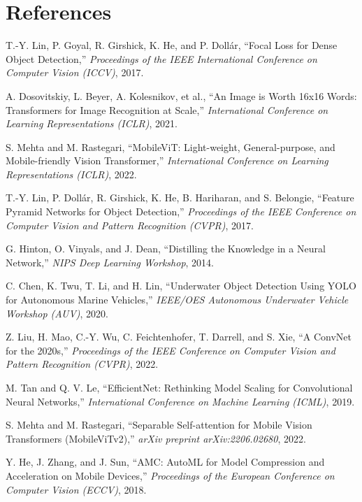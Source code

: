 \chapter*{References}

\begin{enumerate}

 T.-Y. Lin, P. Goyal, R. Girshick, K. He, and P. Dollár,
``Focal Loss for Dense Object Detection,''
\textit{Proceedings of the IEEE International Conference on Computer Vision (ICCV)}, 2017.

 A. Dosovitskiy, L. Beyer, A. Kolesnikov, et al.,
``An Image is Worth 16x16 Words: Transformers for Image Recognition at Scale,''
\textit{International Conference on Learning Representations (ICLR)}, 2021.

 S. Mehta and M. Rastegari,
``MobileViT: Light-weight, General-purpose, and Mobile-friendly Vision Transformer,''
\textit{International Conference on Learning Representations (ICLR)}, 2022.

 T.-Y. Lin, P. Dollár, R. Girshick, K. He, B. Hariharan, and S. Belongie,
``Feature Pyramid Networks for Object Detection,''
\textit{Proceedings of the IEEE Conference on Computer Vision and Pattern Recognition (CVPR)}, 2017.

 G. Hinton, O. Vinyals, and J. Dean,
``Distilling the Knowledge in a Neural Network,''
\textit{NIPS Deep Learning Workshop}, 2014.

 C. Chen, K. Twu, T. Li, and H. Lin,
``Underwater Object Detection Using YOLO for Autonomous Marine Vehicles,''
\textit{IEEE/OES Autonomous Underwater Vehicle Workshop (AUV)}, 2020.

 Z. Liu, H. Mao, C.-Y. Wu, C. Feichtenhofer, T. Darrell, and S. Xie,
``A ConvNet for the 2020s,''
\textit{Proceedings of the IEEE Conference on Computer Vision and Pattern Recognition (CVPR)}, 2022.

 M. Tan and Q. V. Le,
``EfficientNet: Rethinking Model Scaling for Convolutional Neural Networks,''
\textit{International Conference on Machine Learning (ICML)}, 2019.

 S. Mehta and M. Rastegari,
``Separable Self-attention for Mobile Vision Transformers (MobileViTv2),''
\textit{arXiv preprint arXiv:2206.02680}, 2022.

 Y. He, J. Zhang, and J. Sun,
``AMC: AutoML for Model Compression and Acceleration on Mobile Devices,''
\textit{Proceedings of the European Conference on Computer Vision (ECCV)}, 2018.


\end{enumerate}
